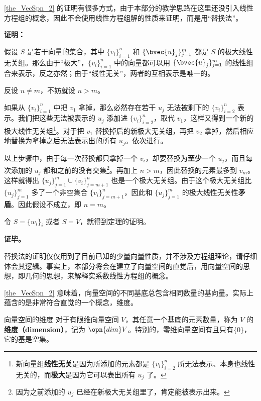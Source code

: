 \autoref{the_VecSpn_2} 的证明有很多方式，由于本部分的教学思路在这里还没引入线性方程组的概念，因此不会使用线性方程组解的性质来证明，而是用“替换法”。


\textbf{证明：}

假设 $S$ 是若干向量的集合，其中 $\{v_i\}_{i=1}^n$ 和 $\{\bvec{u}_j\}^m_{j=1}$ 都是 $S$ 的极大线性无关组。那么由于“极大”，$\{v_i\}_{i=1}^n$ 中的向量都可以用 $\{\bvec{u}_j\}^m_{j=1}$ 的线性组合来表示，反之亦然；由于“线性无关”，两者的互相表示是唯一的。

反设 $n\not=m$，不妨就设 $n>m$。

如果从 $\{v_i\}_{i=1}^n$ 中把 $v_1$ 拿掉，那么必然存在若干 $u_j$ 无法被剩下的 $\{v_i\}_{i=2}^n$ 表示。我们把这些无法被表示的 $u_j$ 添加进 $\{v_i\}_{i=2}^n$，取代 $v_1$，这样又得到一个新的极大线性无关组\footnote{新向量组\textbf{线性无关}是因为所添加的元素都是 $\{v_i\}_{i=2}^n$ 所无法表示、本身也线性无关的，而\textbf{极大}是因为它可以表出所有 $u_j$ 了。}。对于把 $v_1$ 替换掉后的新极大无关组，再把 $v_2$ 拿掉，然后相应地替换为拿掉之后无法表示出的所有 $u_j$。依次进行。

以上步骤中，由于每一次替换都只拿掉一个 $v_i$，却要替换为\textbf{至少}一个 $u_j$，而且每次添加的 $u_j$ 都和之前的没有交集\footnote{因为之前添加的 $u_j$ 已经在新极大无关组里了，肯定能被表示出来。}。再加上 $n>m$，因此替换的元素最多到 $v_m$。这样就得出 $\{u_j\}^m_{j=1} \cup \{v_i\}^n_{j=m+1}$ 也是一个极大无关组。由于这个极大无关组比 $\{u_j\}^m_{j=1}$ 多了一个非空集合 $\{v_i\}^n_{j=m+1}$，因此和 $\{u_j\}^m_{j=1}$ 的极大线性无关性\textbf{矛盾}。因此假设不成立，即 $n=m$。

令 $S=\{w_i\}_i$ 或者 $S=V$，就得到定理的证明。

\textbf{证毕。}

替换法的证明仅仅用到了目前已知的少量向量性质，并不涉及方程组理论，请仔细体会其逻辑。事实上，本部分将会在建立了向量空间的直觉后，用向量空间的思想，即几何的思想，来解释实系数线性方程组的概念。

\autoref{the_VecSpn_2} 意味着，向量空间的不同基底总包含相同数量的基向量。实际上蕴含的是非常符合直觉的一个概念，维度。

\begin{definition}{向量空间的维度}
对于有限维向量空间 $V$，其任意一个基底的元素数量，称为 $V$ 的\textbf{维度（dimension）}，记为 $\opn{dim} V$。特别的，零维向量空间有且只有$\{0\}$，它的基是空集。
\end{definition}


